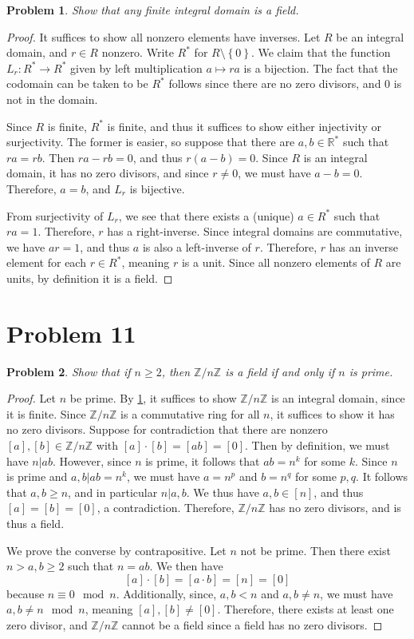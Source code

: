 \documentclass[11pt, letterpaper]{article}
\theoremstyle{plain}
\newtheorem{problem}{Problem}[section]
\begin{document}
\begin{problem}\label{10}
	Show that any finite integral domain is a field.
\end{problem}
\begin{proof}
	It suffices to show all nonzero elements have inverses. Let $R$ be an integral domain, and $r\in R$ nonzero. Write $R^*$ for $R\setminus \left\{ 0 \right\} $. We claim that the function $L_r : R^* \to R^*$ given by left multiplication $a\mapsto ra$ is a bijection. The fact that the codomain can be taken to be $R^*$ follows since there are no zero divisors, and 0 is not in the domain.

	Since $R$ is finite, $R^*$ is finite, and thus it suffices to show either injectivity or surjectivity. The former is easier, so suppose that there are $a,b\in\mathbb{R}^*$ such that $ra=rb$. Then $ra-rb=0$, and thus $r(a-b)=0$. Since $R$ is an integral domain, it has no zero divisors, and since $r\neq 0$, we must have $a-b=0$. Therefore, $a=b$, and $L_r$ is bijective.

	From surjectivity of $L_r$, we see that there exists a (unique) $a\in R^*$ such that $ra=1$. Therefore, $r$ has a right-inverse. Since integral domains are commutative, we have $ar=1$, and thus $a$ is also a left-inverse of $r$. Therefore, $r$ has an inverse element for each $r\in R^*$, meaning $r$ is a unit. Since all nonzero elements of $R$ are units, by definition it is a field.
\end{proof}

\section{Problem 11}
\begin{problem}
	Show that if $n\geq 2$, then $\mathbb{Z} /n\mathbb{Z} $ is a field if and only if $n$ is prime.
\end{problem}
\begin{proof}
	Let $n$ be prime. By \cref{10}, it suffices to show $\mathbb{Z} /n\mathbb{Z} $ is an integral domain, since it is finite. Since $\mathbb{Z} /n\mathbb{Z} $ is a commutative ring for all $n$, it suffices to show it has no zero divisors. Suppose for contradiction that there are nonzero $[a],[b]\in\mathbb{Z} /n\mathbb{Z} $ with $[a]\cdot [b]=[ab]=[0]$. Then by definition, we must have $n|ab$. However, since $n$ is prime, it follows that $ab = n^k$ for some $k$. Since $n$ is prime and $a,b|ab=n^k$, we must have $a=n^p$ and $b=n^q$ for some $p,q$. It follows that $a,b \geq n$, and in particular $n|a,b$. We thus have $a,b\in[n]$, and thus $[a]=[b]=[0]$, a contradiction. Therefore, $\mathbb{Z} /n\mathbb{Z} $ has no zero divisors, and is thus a field.

	We prove the converse by contrapositive. Let $n$ not be prime. Then there exist $n>a,b \geq 2$ such that $n=ab$. We then have
	\[
		[a]\cdot [b]=[a\cdot b]=[n]=[0]
	\]
	because $n\equiv 0\mod{n}$. Additionally, since, $a,b<n$ and $a,b\neq n$, we must have $a,b \neq n\mod{n}$, meaning $[a],[b]\neq [0]$. Therefore, there exists at least one zero divisor, and $\mathbb{Z} /n\mathbb{Z} $ cannot be a field since a field has no zero divisors.
\end{proof}
\end{document}
